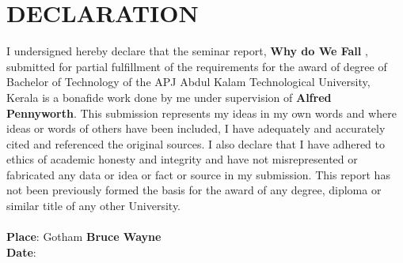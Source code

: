 \section*{\centering DECLARATION}

    I undersigned hereby declare that the seminar report, \textbf{Why do We Fall} ,
    submitted for partial fulfillment of the requirements for the award of degree of Bachelor of Technology of the APJ Abdul Kalam Technological University, Kerala is a bonafide work done by me under supervision of \textbf{Alfred Pennyworth}. This submission represents my ideas in my own words and where ideas or words of others have been included, I have adequately and accurately cited and referenced the original sources. I also declare that I have adhered to ethics of academic honesty and integrity and have not misrepresented or fabricated any data or idea or fact or source in my submission. This report has not been previously formed the basis for the award of any degree, diploma or similar title of any other University. \\ \\
{\textbf{Place}: Gotham     \hfill      \textbf{Bruce Wayne}} \\
{\textbf{Date}: }
\newpage